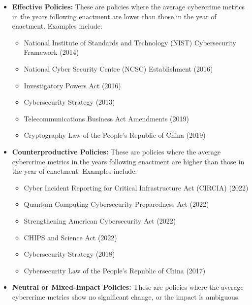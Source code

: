     \begin{itemize}
        \item \textbf{Effective Policies:}
            These are policies where the average cybercrime metrics in the years following enactment
            are lower than those in the year of enactment.
            Examples include:
            \begin{itemize}
                \item National Institute of Standards and Technology (NIST) Cybersecurity Framework (2014)
                \item National Cyber Security Centre (NCSC) Establishment (2016)
                \item Investigatory Powers Act (2016)
                \item Cybersecurity Strategy (2013)
                \item Telecommunications Business Act Amendments (2019)
                \item Cryptography Law of the People’s Republic of China (2019)
            \end{itemize}

        \item \textbf{Counterproductive Policies:}
            These are policies where the average cybercrime metrics in the years following enactment
            are higher than those in the year of enactment.
            Examples include:
            \begin{itemize}
                \item Cyber Incident Reporting for Critical Infrastructure Act (CIRCIA) (2022)
                \item Quantum Computing Cybersecurity Preparedness Act (2022)
                \item Strengthening American Cybersecurity Act (2022)
                \item CHIPS and Science Act (2022)
                \item Cybersecurity Strategy (2018)
                \item Cybersecurity Law of the People’s Republic of China (2017)
            \end{itemize}

        \item \textbf{Neutral or Mixed-Impact Policies:}
            These are policies where
            the average cybercrime metrics show no significant change, or the impact is ambiguous.
    \end{itemize}

